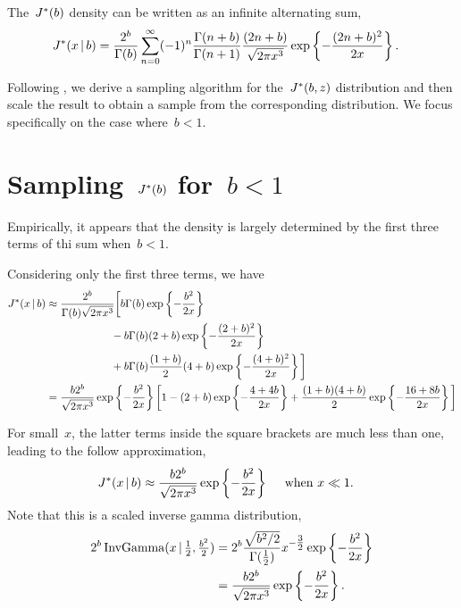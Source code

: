 \documentclass[aos,preprint]{imsart}
\begin{document}
The~$J^{*}(b)$ density can be written as an infinite alternating sum,
\begin{align}
  \distJacobi(x \given b) &= \frac{2^b}{\Gamma(b)}
  \sum_{n=0}^\infty (-1)^n \frac{\Gamma(n+b)}{\Gamma(n+1)} \frac{(2n+b)}{\sqrt{2\pi x^3}}
  \exp\left\{- \frac{(2n+b)^2}{2x} \right\}.
\end{align}


Following \citet{windle2014sampling}, we derive a sampling algorithm for
the~$J^{*}(b,z)$ distribution and then scale the result to obtain
a sample from the corresponding \polyagamma distribution. We focus specifically
on the case where~$b<1$.

\section{Sampling~$J^{*}(b)$ for~$b<1$}
Empirically, it appears that the \polyagamma density is largely determined
by the first three terms of thi sum when~$b<1$.

Considering only the first three terms, we have
\begin{align}
  \distJacobi(x \given b) &\approx \frac{2^b}{\Gamma(b) \sqrt{2 \pi x^3}}
  \bigg[  b\Gamma(b)       \exp \left \{-\frac{b^2}{2x}      \right \} \\
\nonumber & \qquad \qquad \qquad -b\Gamma(b) (2+b) \exp \left \{ -\frac{(2+b)^2}{2x} \right \} \\
\nonumber & \qquad \qquad \qquad +b\Gamma(b)\frac{(1+b)}{2} (4+b) \exp \left \{ -\frac{(4+b)^2}{2x} \right \}
\bigg] \\
  &= \frac{b 2^b}{\sqrt{2 \pi x^3}} \exp \left \{-\frac{b^2}{2x} \right \}
  \bigg[1
        - (2+b) \exp \left \{-\frac{4+4b}{2x} \right \}
        + \frac{(1+b)(4+b)}{2}  \exp \left \{-\frac{16+8b}{2x} \right \}
  \bigg]
\end{align}

For small~$x$, the latter terms inside the square brackets are much less than one,
leading to the follow approximation,
\begin{align}
  \distJacobi(x \given b) &\approx \frac{b 2^b}{\sqrt{2 \pi x^3}} \exp \left \{-\frac{b^2}{2x} \right \} \quad \text{ when } x \ll 1.
\end{align}
Note that this is a
scaled inverse gamma distribution,
\begin{align}
  2^b \, \distInvGamma(x \given \tfrac{1}{2}, \tfrac{b^2}{2})
  &= 2^b \frac{\sqrt{b^2/2}}{\Gamma(\tfrac{1}{2})} x^{-\tfrac{3}{2}} \exp\left\{-\frac{b^2}{2x} \right\} \\
  &= \frac{b 2^b}{\sqrt{2 \pi x^3}} \exp\left\{-\frac{b^2}{2x} \right\}.
\end{align}
\end{document}
